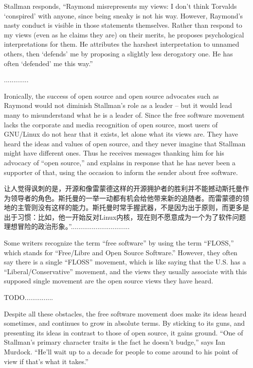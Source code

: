 \ifdefined\eng
Stallman responds, ``Raymond misrepresents my views: I don't think Torvalds `conspired' with anyone, since being sneaky is not his way. However, Raymond's nasty conduct is visible in those statements themselves.   Rather than respond to my views (even as he claims they are) on their merits, he proposes psychological interpretations for them. He attributes the harshest interpretation to unnamed others, then `defends' me by proposing a slightly less derogatory one.  He has often `defended' me this way.''
\fi

\ifdefined\chs
.............
\fi

\ifdefined\eng
Ironically, the success of open source and open source advocates such as Raymond would not diminish Stallman's role as a leader -- but it would lead many to misunderstand what he is a leader of.  Since the free software movement lacks the corporate and media recognition of open source, most users of GNU/Linux do not hear that it exists, let alone what its views are.  They have heard the ideas and values of open source, and they never imagine that Stallman might have different ones.  Thus he receives messages thanking him for his advocacy of ``open source,'' and explains in response that he has never been a supporter of that, using the occasion to inform the sender about free software.
\fi

\ifdefined\chs
让人觉得讽刺的是，开源和像雷蒙德这样的开源拥护者的胜利并不能撼动斯托曼作为领导者的角色。斯托曼的一举一动都有机会给他带来新的追随者。而雷蒙德的领地的主管则没有这样的能力。斯托曼时常手握武器，不是因为出于原则，而更多是出于习惯：比如，他一开始反对Linux内核，现在则不愿意成为一个为了软件问题理想冒险的政治形象。''...............................
\fi

\ifdefined\eng
Some writers recognize the term ``free software'' by using the term ``FLOSS,'' which stands for ``Free/Libre and Open Source Software.''  However, they often say there is a single ``FLOSS'' movement, which is like saying that the U.S. has a ``Liberal/Conservative'' movement, and the views they usually associate with this supposed single movement are the open source views they have heard.
\fi

\ifdefined\chs
TODO...............
\fi

\ifdefined\eng
Despite all these obstacles, the free software movement does make its ideas heard sometimes, and continues to grow in absolute terms.  By sticking to its guns, and presenting its ideas in contrast to those of open source, it gains ground. ``One of Stallman's primary character traits is the fact he doesn't budge,'' says Ian Murdock. ``He'll wait up to a decade for people to come around to his point of view if that's what it takes.''
\fi

